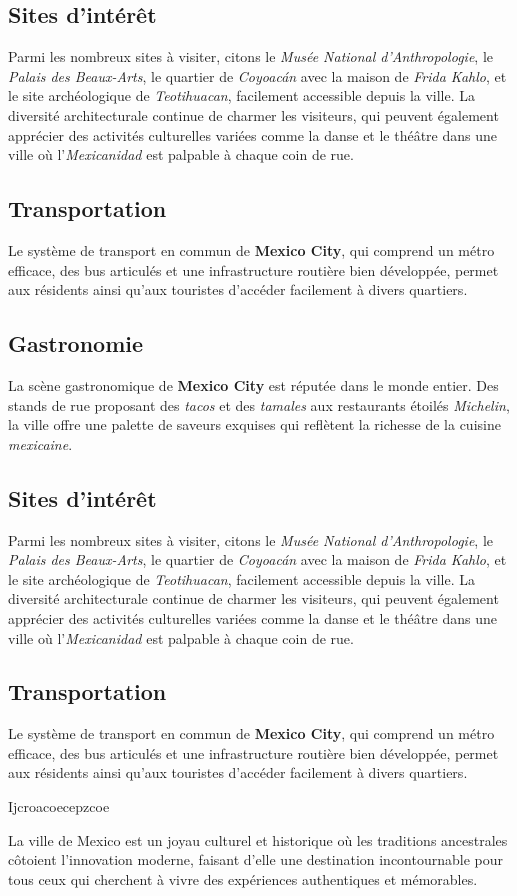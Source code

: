 \documentclass[12pt, a4paper]{article}
\begin{document}
\subsection*{\textbf{Sites d'intérêt}}

Parmi les nombreux sites à visiter, citons le \textit{Musée National d'Anthropologie}, le \textit{Palais des Beaux-Arts}, le quartier de \textit{Coyoacán} avec la maison de \textit{Frida Kahlo}, et le site archéologique de \textit{Teotihuacan}, facilement accessible depuis la ville.
La diversité architecturale continue de charmer les visiteurs, qui peuvent également apprécier des activités culturelles variées comme la danse et le théâtre dans une ville où l'\textit{Mexicanidad} est palpable à chaque coin de rue. \subsection*{\textbf{Transportation}} Le système de transport en commun de \textbf{Mexico City}, qui comprend un métro efficace, des bus articulés et une infrastructure routière bien développée, permet aux résidents ainsi qu'aux touristes d'accéder facilement à divers quartiers.

\subsection*{\textbf{Gastronomie}}

La scène gastronomique de \textbf{Mexico City} est réputée dans le monde entier. Des stands de rue proposant des \textit{tacos} et des \textit{tamales} aux restaurants étoilés \textit{Michelin}, la ville offre une palette de saveurs exquises qui reflètent la richesse de la cuisine \textit{mexicaine}.

\subsection*{\textbf{Sites d'intérêt}}

Parmi les nombreux sites à visiter, citons le \textit{Musée National d'Anthropologie}, le \textit{Palais des Beaux-Arts}, le quartier de \textit{Coyoacán} avec la maison de \textit{Frida Kahlo}, et le site archéologique de \textit{Teotihuacan}, facilement accessible depuis la ville.
La diversité architecturale continue de charmer les visiteurs, qui peuvent également apprécier des activités culturelles variées comme la danse et le théâtre dans une ville où l'\textit{Mexicanidad} est palpable à chaque coin de rue. \subsection*{\textbf{Transportation}} Le système de transport en commun de \textbf{Mexico City}, qui comprend un métro efficace, des bus articulés et une infrastructure routière bien développée, permet aux résidents ainsi qu'aux touristes d'accéder facilement à divers quartiers.

Ijcroacoecepzcoe


La ville de Mexico est un joyau culturel et historique où les traditions ancestrales côtoient l'innovation moderne, faisant d'elle une destination incontournable pour tous ceux qui cherchent à vivre des expériences authentiques et mémorables.
\end{document}
